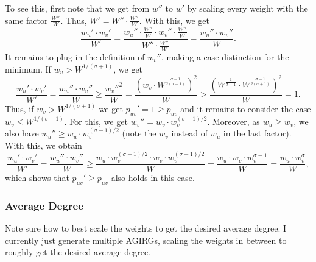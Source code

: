 \documentclass[a4paper,11pt]{article}
\begin{document}
To see this, first note that we get from $w''$ to $w'$ by scaling
every weight with the same factor $\frac{W''}{W}$.  Thus,
$W' = W'' \cdot \frac{W''}{W}$.  With this, we get
%
\begin{equation*}
  \frac{w_u' \cdot w_v'}{W'} =
  \frac{w_u'' \cdot \frac{W''}{W}  \cdot w_v'' \cdot
    \frac{W''}{W}}{W'' \cdot \frac{W''}{W}}
  = \frac{w_u'' \cdot  w_v''}{W}.
\end{equation*}
%
It remains to plug in the definition of $w_v''$, making a case
distinction for the minimum.  If $w_v > W^{1 / (\sigma + 1)}$, we get
%
\begin{equation*}
  \frac{w_u' \cdot w_v'}{W'} =
  \frac{w_u'' \cdot  w_v''}{W} \ge
  \frac{w_v''^2}{W} = 
  \frac{\left(w_v \cdot W^{\frac{\sigma - 1}{2(\sigma +
          1)}}\right)^2}{W} >
  \frac{\left(W^{\frac{1}{\sigma + 1}} \cdot W^{\frac{\sigma - 1}{2(\sigma +
          1)}}\right)^2}{W} = 1.
\end{equation*}
%
Thus, if $w_v > W^{1 / (\sigma + 1)}$ we get $p_{uv}' = 1 \ge p_{uv}$
and it remains to consider the case $w_v \le W^{1 / (\sigma + 1)}$.
For this, we get $w_v'' = w_v \cdot w_v^{(\sigma - 1) / 2}$.
Moreover, as $w_u \ge w_v$, we also have
$w_u'' \ge w_u \cdot w_v^{(\sigma - 1) / 2}$ (note the $w_v$ instead of
$w_u$ in the last factor).  With this, we obtain 
%
\begin{equation*}
  \frac{w_u' \cdot w_v'}{W'} =
  \frac{w_u'' \cdot  w_v''}{W} \ge
  \frac{w_u \cdot w_v^{(\sigma - 1) / 2} \cdot w_v \cdot w_v^{(\sigma
      - 1) / 2}}{W} =
  \frac{w_u \cdot w_v \cdot w_v^{\sigma - 1}}{W} =
  \frac{w_u \cdot w_v^\sigma}{W},
\end{equation*}
%
which shows that $p_{uv}' \ge p_{uv}$ also holds in this case.

\subsubsection{Average Degree}
\label{sec:average-degree}

Note sure how to best scale the weights to get the desired average
degree.  I currently just generate multiple AGIRGs, scaling the
weights in between to roughly get the desired average degree.
\end{document}
